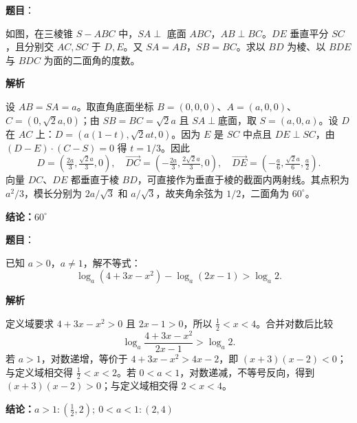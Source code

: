 \begin{answer}

\textbf{题目}：

如图，在三棱锥 $S-ABC$ 中，$SA\perp$ 底面 $ABC$，$AB\perp BC$。$DE$ 垂直平分 $SC$，且分别交 $AC,SC$ 于 $D,E$。又 $SA=AB$，$SB=BC$。求以 $BD$ 为棱、以 $BDE$ 与 $BDC$ 为面的二面角的度数。
\nopagebreak[4]
\begin{center}\end{center}
\nopagebreak[4]
\textbf{解析}

设 $AB=SA=a$。取直角底面坐标 $B=(0,0,0)$、$A=(a,0,0)$、$C=(0,\sqrt2a,0)$；由 $SB=BC=\sqrt2a$ 且 $SA\perp$底面，取 $S=(a,0,a)$。设 $D$ 在 $AC$ 上：$D=(a(1-t),\sqrt2at,0)$。因为 $E$ 是 $SC$ 中点且 $DE\perp SC$，由 $(D-E)\cdot(C-S)=0$ 得 $t=1/3$。因此
\nopagebreak[4]
\[
D=(\tfrac{2a}{3},\tfrac{\sqrt2a}{3},0),\quad
\overrightarrow{DC}=(-\tfrac{2a}{3},\tfrac{2\sqrt2a}{3},0),\quad
\overrightarrow{DE}=(-\tfrac a6,\tfrac{\sqrt2a}{6},\tfrac a2).
\]
向量 $DC$、$DE$ 都垂直于棱 $BD$，可直接作为垂直于棱的截面内两射线。其点积为 $a^2/3$，模长分别为 $2a/\sqrt3$ 和 $a/\sqrt3$，故夹角余弦为 $1/2$，二面角为 $60^\circ$。

\textbf{结论：$60^\circ$}


\end{answer}
\begin{answer}

\textbf{题目}：

已知 $a>0$，$a\ne1$，解不等式：
\nopagebreak[4]
\[
\log_a(4+3x-x^2)-\log_a(2x-1)>\log_a2.
\]

\textbf{解析}

定义域要求 $4+3x-x^2>0$ 且 $2x-1>0$，所以 $\frac12<x<4$。合并对数后比较
\nopagebreak[4]
\[
\log_a\frac{4+3x-x^2}{2x-1}>\log_a2.
\]
若 $a>1$，对数递增，等价于 $4+3x-x^2>4x-2$，即 $(x+3)(x-2)<0$；与定义域相交得 $\frac12<x<2$。若 $0<a<1$，对数递减，不等号反向，得到 $(x+3)(x-2)>0$；与定义域相交得 $2<x<4$。

\textbf{结论：$a>1:(\frac12,2);\ 0<a<1:(2,4)$}


\end{answer}
